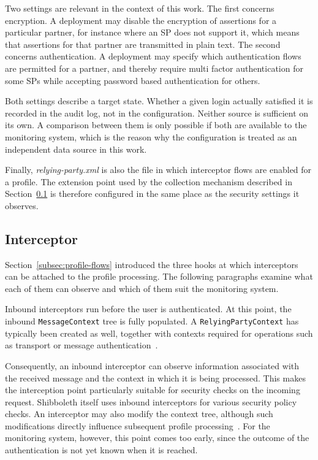 \documentclass[../main.tex]{subfiles}
\begin{document}
Two settings are relevant in the context of this work. 
The first concerns encryption. 
A deployment may disable the encryption of assertions for a particular partner, for instance where 
an SP does not support it, which means that assertions for that partner are transmitted 
in plain text. 
The second concerns authentication. 
A deployment may specify which authentication flows are permitted for a partner, and thereby 
require multi factor authentication for some SPs while accepting password based authentication 
for others.

Both settings describe a target state. 
Whether a given login actually satisfied it is recorded in the audit log, not in the configuration. 
Neither source is sufficient on its own. 
A comparison between them is only possible if both are available to the monitoring system, which 
is the reason why the configuration is treated as an independent data source in this work.

Finally, \textit{relying-party.xml} is also the file in which interceptor flows are enabled for a 
profile. 
The extension point used by the collection mechanism described in Section~\ref{subsec:interceptor} 
is therefore configured in the same place as the security settings it observes. 

\subsection{Interceptor}\label{subsec:interceptor}

Section~\ref{subsec:profile-flows} introduced the three hooks at which interceptors can be attached 
to the profile processing. 
The following paragraphs examine what each of them can observe and which of them suit the 
monitoring system. 

Inbound interceptors run before the user is authenticated. 
At this point, the inbound \texttt{Message\allowbreak{}Context} tree is fully populated. 
A \texttt{Relying\allowbreak{}Party\allowbreak{}Context} has typically been created as well, together 
with contexts required for operations such as transport or message authentication~\cite{ProfileHandling}.

Consequently, an inbound interceptor can observe information associated with the received message 
and the context in which it is being processed. 
This makes the interception point particularly suitable for security checks on the incoming request. 
Shibboleth itself uses inbound interceptors for various security policy checks. 
An interceptor may also modify the context tree, although such modifications directly influence 
subsequent profile processing~\cite{ProfileHandling}. 
For the monitoring system, however, this point comes too early, since the outcome of the 
authentication is not yet known when it is reached.
\end{document}

